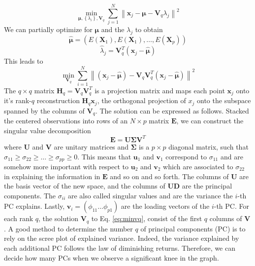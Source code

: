 \begin{equation}
    \label{eq:SSE}
    \min _{\bm{\mu},\left\{\lambda_i\right\}, \mathbf{V}_q} \sum_{j=1}^N\left\|\mathbf{x}_j-\bm{\mu}-\mathbf{V}_q \lambda_j\right\|^2
\end{equation}
We can partially optimize for $\bm{\mu}$ and the $\lambda_j$ to obtain
\begin{equation}
    \hat{\bm{\mu}} = \left(E\left(\mathbf{X}_1\right), E\left(\mathbf{X}_1\right), \dots, E\left(\mathbf{X}_p\right)\right)
\end{equation}
\begin{equation}
    \hat{\lambda}_j = \mathbf{V}_q^{T}(\mathbf{x}_j-\hat{\bm{\mu}})
\end{equation}
This leads to 
\begin{equation}
\label{eq:minvq}
    \min _{\mathbf{V}_q} \sum_{i=1}^N\left\|\left(\mathbf{x}_j-\hat{\bm{\mu}}\right)-\mathbf{V}_q \mathbf{V}_q^T\left(\mathbf{x}_j-\hat{\bm{\mu}}\right)\right\|^2
\end{equation}
The $q \times q$ matrix $\mathbf{H}_q=\mathbf{V}_q\mathbf{V}_q^T$ is a projection matrix and maps each point $\mathbf{x}_j$ onto it's rank-$q$ reconstruction $\mathbf{H}_q\mathbf{x}_j$, the orthogonal projection of $x_j$ onto the subspace spanned by the columns of $\mathbf{V}_q$. The solution can be expressed as follows. Stacked the centered observations into rows of an $N\times p$ matrix $\mathbf{E}$, we can construct the singular value decomposition
\begin{equation}
    \label{eq:SVD}
    \mathbf{E}=\mathbf{U}\bm{\Sigma}\mathbf{V}^T
\end{equation}
where $\mathbf{U}$ and $\mathbf{V}$ are unitary matrices and $\bm{\Sigma}$ is a $p \times p$ diagonal matrix, such that $\sigma_{11}\ge \sigma_{22} \ge \dots \ge \sigma_{pp}\ge 0$. This means that $\mathbf{u}_1$ and $\mathbf{v}_1$ correspond to $\sigma_{11}$ and are somehow more important with respect to $\mathbf{u}_2$ and $\mathbf{v}_2$ which are associated to $\sigma_{22}$ in explaining the information in $\mathbf{E}$ and so on and so forth. The columns of $\mathbf{U}$ are the basis vector of the new space, and the columns of $\mathbf{U}\mathbf{D}$ are the principal components. The $\sigma_{ii}$ are also called singular values and are the variance the $i$-th PC explains. Lastly, $\mathbf{v}_i=(\phi_{11} \dots \phi_{p1})$ are the loading vectors of the $i$-th PC.  For each rank $q$, the solution $\mathbf{V}_q$ to Eq. \ref{eq:minvq}, consist of the first $q$ columns of $\mathbf{V}$. A good method to determine the number $q$ of principal components (PC) is to rely on the scree plot of explained variance. Indeed, the variance explained by each additional PC follows the law of diminishing returns. Therefore, we can decide how many PCs when we observe a significant knee in the graph.

